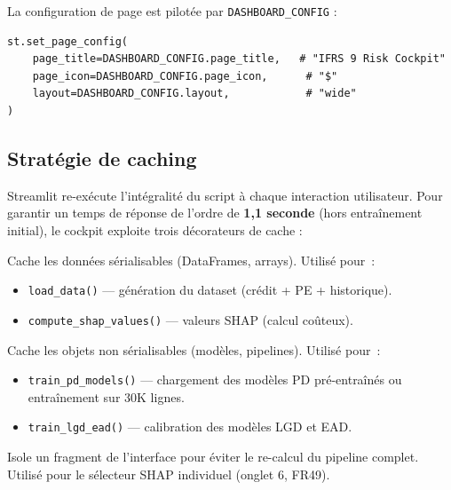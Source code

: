 \documentclass[12pt,a4paper]{article}
\begin{document}
La configuration de page est pilot\'ee par \texttt{DASHBOARD\_CONFIG} :

\begin{lstlisting}
st.set_page_config(
    page_title=DASHBOARD_CONFIG.page_title,   # "IFRS 9 Risk Cockpit"
    page_icon=DASHBOARD_CONFIG.page_icon,      # "$"
    layout=DASHBOARD_CONFIG.layout,            # "wide"
)
\end{lstlisting}

\subsection{Strat\'egie de caching}

Streamlit re-ex\'ecute l'int\'egralit\'e du script \`a chaque interaction utilisateur. Pour garantir un temps de r\'eponse de l'ordre de \textbf{1,1 seconde} (hors entra\^{i}nement initial), le cockpit exploite trois d\'ecorateurs de cache :

\begin{definitionbox}
\begin{description}[leftmargin=1em]
    \item[\texttt{@st.cache\_data}] Cache les donn\'ees s\'erialisables (DataFrames, arrays). Utilis\'e pour~:
    \begin{itemize}
        \item \texttt{load\_data()} --- g\'en\'eration du dataset (cr\'edit + PE + historique).
        \item \texttt{compute\_shap\_values()} --- valeurs SHAP (calcul co\^uteux).
    \end{itemize}
    \item[\texttt{@st.cache\_resource}] Cache les objets non s\'erialisables (mod\`eles, pipelines). Utilis\'e pour~:
    \begin{itemize}
        \item \texttt{train\_pd\_models()} --- chargement des mod\`eles PD pr\'e-entra\^{i}n\'es ou entra\^{i}nement sur 30K lignes.
        \item \texttt{train\_lgd\_ead()} --- calibration des mod\`eles LGD et EAD.
    \end{itemize}
    \item[\texttt{@st.fragment}] Isole un fragment de l'interface pour \'eviter le re-calcul du pipeline complet. Utilis\'e pour le s\'electeur SHAP individuel (onglet 6, FR49).
\end{description}
\end{definitionbox}
\end{document}
